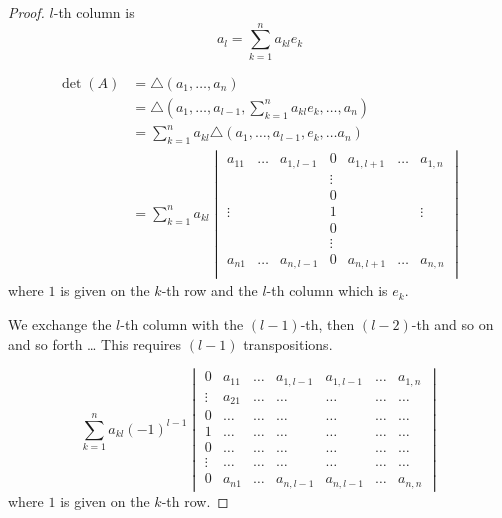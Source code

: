 \documentclass[a4paper,landscape,twocolumn]{article}
\begin{document}
\begin{proof}
  $l$-th column is
  \[ a_l = \sum_{k=1}^n a_{kl} e_{k} \]

  \begin{align*}
    \det(A) &= \triangle(a_1, \ldots, a_n) \\
      &= \triangle (a_1, \ldots, a_{l-1}, \sum_{k=1}^n a_{kl} e_k, \ldots, a_n) \\
      &= \sum_{k=1}^n a_{kl} \triangle (a_1, \ldots, a_{l-1}, e_k, \ldots a_n) \\
      &= \sum_{k=1}^n a_{kl}
        \begin{vmatrix}
          a_{11} & \ldots & a_{1,l-1} & 0 & a_{1,l+1} & \ldots & a_{1,n} \\
                 &        &           & \vdots &      &        & \\
                 &        &           & 0      &      &        & \\
          \vdots &        &           & 1      &      &        & \vdots \\
                 &        &           & 0      &      &        & \\
                 &        &           & \vdots &      &        & \\
          a_{n1} & \ldots & a_{n,l-1} & 0 & a_{n,l+1} & \ldots & a_{n,n} \\
        \end{vmatrix}
  \end{align*}
  where $1$ is given on the $k$-th row and the $l$-th column which is $e_k$.

  We exchange the $l$-th column with the $(l-1)$-th, then $(l-2)$-th and so on and so forth \dots
  This requires $(l-1)$ transpositions.

  \[
    \sum_{k=1}^n a_{kl} (-1)^{l-1}
    \begin{vmatrix}
      0 & a_{11} & \ldots & a_{1,l-1} & a_{1,l-1} & \ldots & a_{1,n} \\
      \vdots & a_{21} & \ldots & \ldots & \ldots & \ldots & \ldots \\
      0 & \ldots & \ldots & \ldots & \ldots & \ldots & \ldots \\
      1 & \ldots & \ldots & \ldots & \ldots & \ldots & \ldots \\
      0 & \ldots & \ldots & \ldots & \ldots & \ldots & \ldots \\
      \vdots & \ldots & \ldots & \ldots & \ldots & \ldots & \ldots \\
      0 & a_{n1} & \ldots & a_{n,l-1} & a_{n,l-1} & \ldots & a_{n,n}
    \end{vmatrix}
  \]
  where $1$ is given on the $k$-th row.


\end{proof}
\end{document}
